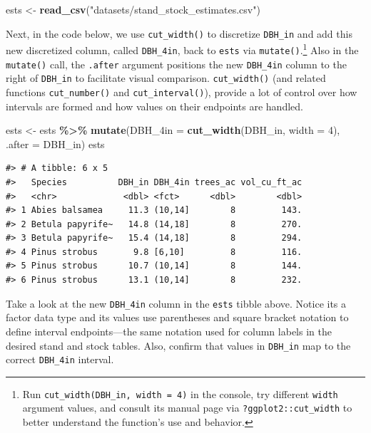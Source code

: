 \documentclass[
  11pt,
]{krantz}
\newenvironment{Shaded}{\begin{snugshade}}{\end{snugshade}}
\newcommand{\DataTypeTok}[1]{\textcolor[rgb]{0.13,0.29,0.53}{#1}}
\newcommand{\DecValTok}[1]{\textcolor[rgb]{0.00,0.00,0.81}{#1}}
\newcommand{\KeywordTok}[1]{\textcolor[rgb]{0.13,0.29,0.53}{\textbf{#1}}}
\newcommand{\NormalTok}[1]{#1}
\newcommand{\OperatorTok}[1]{\textcolor[rgb]{0.81,0.36,0.00}{\textbf{#1}}}
\newcommand{\StringTok}[1]{\textcolor[rgb]{0.31,0.60,0.02}{#1}}
\theoremstyle{definition}
\theoremstyle{definition}
\theoremstyle{definition}
\theoremstyle{definition}
\theoremstyle{remark}
\begin{document}
\begin{Shaded}
\begin{Highlighting}[]
\NormalTok{ests \textless{}{-}}\StringTok{ }\KeywordTok{read\_csv}\NormalTok{(}\StringTok{"datasets/stand\_stock\_estimates.csv"}\NormalTok{)}
\end{Highlighting}
\end{Shaded}

Next, in the code below, we use \texttt{cut\_width()} to discretize \texttt{DBH\_in} and add this new discretized column, called \texttt{DBH\_4in}, back to \texttt{ests} via \texttt{mutate()}.\footnote{Run \texttt{cut\_width(DBH\_in,\ width\ =\ 4)} in the console, try different \texttt{width} argument values, and consult its manual page via \texttt{?ggplot2::cut\_width} to better understand the function's use and behavior.} Also in the \texttt{mutate()} call, the \texttt{.after} argument positions the new \texttt{DBH\_4in} column to the right of \texttt{DBH\_in} to facilitate visual comparison. \texttt{cut\_width()} (and related functions \texttt{cut\_number()} and \texttt{cut\_interval()}), provide a lot of control over how intervals are formed and how values on their endpoints are handled.

\begin{Shaded}
\begin{Highlighting}[]
\NormalTok{ests \textless{}{-}}\StringTok{ }\NormalTok{ests }\OperatorTok{\%\textgreater{}\%}
\StringTok{  }\KeywordTok{mutate}\NormalTok{(}\DataTypeTok{DBH\_4in =} \KeywordTok{cut\_width}\NormalTok{(DBH\_in, }\DataTypeTok{width =} \DecValTok{4}\NormalTok{), }\DataTypeTok{.after =}\NormalTok{ DBH\_in)}
\NormalTok{ests}
\end{Highlighting}
\end{Shaded}

\begin{verbatim}
#> # A tibble: 6 x 5
#>   Species          DBH_in DBH_4in trees_ac vol_cu_ft_ac
#>   <chr>             <dbl> <fct>      <dbl>        <dbl>
#> 1 Abies balsamea     11.3 (10,14]        8         143.
#> 2 Betula papyrife~   14.8 (14,18]        8         270.
#> 3 Betula papyrife~   15.4 (14,18]        8         294.
#> 4 Pinus strobus       9.8 [6,10]         8         116.
#> 5 Pinus strobus      10.7 (10,14]        8         144.
#> 6 Pinus strobus      13.1 (10,14]        8         232.
\end{verbatim}

Take a look at the new \texttt{DBH\_4in} column in the \texttt{ests} tibble above. Notice its a factor data type and its values use parentheses and square bracket notation to define interval endpoints---the same notation used for column labels in the desired stand and stock tables. Also, confirm that values in \texttt{DBH\_in} map to the correct \texttt{DBH\_4in} interval.
\end{document}
